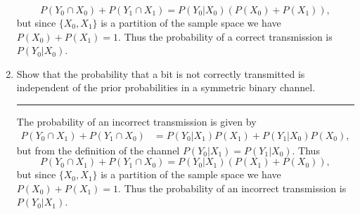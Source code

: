 \documentclass{article}
\newcommand{\horline}
           {\begin{center}
              \noindent\rule{8cm}{0.4pt}
            \end{center}}
\begin{document}
\begin{enumerate}[label=(\alph*)]
{        $$
        P(Y_0 \cap X_0) + P(Y_1 \cap X_1) = P(Y_0 | X_0)(P(X_0) + P(X_1)),
        $$
        but since $\{X_0, X_1\}$ is a partition of the sample space we have
        $P(X_0) + P(X_1) = 1$. Thus the probability of a correct 
        transmission is $P(Y_0 | X_0)$.
       }
  \item{Show that the probability that a bit is not correctly transmitted
        is independent of the prior probabilities in a symmetric binary
        channel.
        \horline
        The probability of an incorrect transmission is given by
        \begin{align*}
        P(Y_0 \cap X_1) + P(Y_1 \cap X_0) 
          & = P(Y_0 | X_1) P(X_1) + P(Y_1 | X_0) P(X_0),
        \end{align*}
        but from the definition of the channel 
        $P(Y_0 | X_1) = P(Y_1 | X_0)$. Thus
        $$
        P(Y_0 \cap X_1) + P(Y_1 \cap X_0) = P(Y_0 | X_1) (P(X_1) + P(X_0)),
        $$
        but since $\{X_0, X_1\}$ is a partition of the sample space we have
        $P(X_0) + P(X_1) = 1$. Thus the probability of an incorrect
        transmission is $P(Y_0 | X_1)$.
       }
\end{enumerate}
\end{document}

